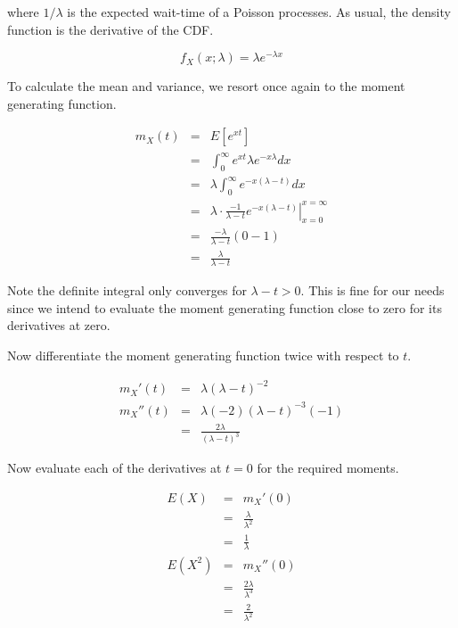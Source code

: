 \documentclass[]{article}
\begin{document}
where $1/\lambda$ is the expected wait-time of a Poisson processes.
As usual, the density function is the derivative of the CDF.

\begin{equation} \label{exp_density}
f_X(x; \lambda) = \lambda e^{-\lambda x}
\end{equation}

To calculate the mean and variance, we resort once again to the
moment generating function.

\begin{eqnarray*}
m_X(t) & = & E[e^{xt}] \\
   & = & \int_0^{\infty} e^{xt} \lambda e^{-x \lambda} dx \\
   & = & \lambda \int_0^{\infty} e^{-x(\lambda - t)} dx \\
   & = & \left. \lambda \cdot \frac{-1}{\lambda - t} e^{-x(\lambda - t)}
      \right|_{x=0}^{x=\infty} \\
   & = & \frac{-\lambda}{\lambda - t} (0 - 1) \\
   & = & \frac{\lambda}{\lambda - t}
\end{eqnarray*}

Note the definite integral only converges for $\lambda - t > 0$.
This is fine for our needs since we intend to evaluate the moment
generating function close to zero for its derivatives at zero.

Now differentiate the moment generating function twice with
respect to $t$.

\begin{eqnarray*}
m_X'(t) & = & \lambda(\lambda - t)^{-2}  \\
m_X''(t) & = & \lambda (-2)(\lambda - t)^{-3}(-1) \\
   & = & \frac{2 \lambda}{(\lambda - t)^3}
\end{eqnarray*}

Now evaluate each of the derivatives at $t=0$ for the
required moments.

\begin{eqnarray*}
E(X) & = & m_X'(0) \\
   & = & \frac{\lambda}{\lambda^2} \\
   & = & \frac{1}{\lambda} \label{expon_mean} \\
E(X^2) & = & m_X''(0) \\
   & = & \frac{2 \lambda}{\lambda^3} \\
   & = & \frac{2}{\lambda^2}
\end{eqnarray*}
\end{document}
